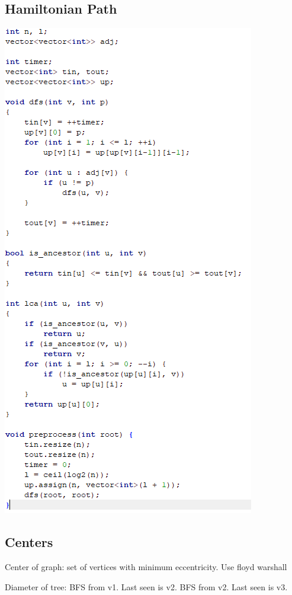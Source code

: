 \documentclass[11pt,twocolumn]{article}
\begin{document}
\subsection{Hamiltonian Path}

\includegraphics[scale=0.7]{lca}

\subsection{Centers}
Center of graph: set of vertices with minimum eccentricity. Use floyd warshall

Diameter of tree: BFS from v1. Last seen is v2. BFS from v2. Last seen is v3.
\end{document}
